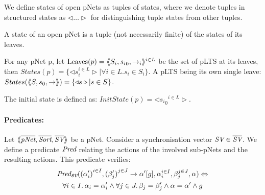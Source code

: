 \documentclass{llncs}
\begin{document}
%

We define states of open pNets as tuples of states, where we denote tuples
in structured states as $\triangleleft\ldots\triangleright$ for distinguishing tuple 
states from other tuples.
\begin{definition}\label{def-states}
  A state of an open pNet is a tuple (not necessarily finite) of the
  states of its leaves.

  For any pNet p, let $\operatorname{Leaves}(p) = \langle\hspace{-0.58ex}\langle S_i,{s_i}_0, \to_i\rangle\hspace{-0.58ex}\rangle^{i \in L}$ be 
  the set of pLTS at its leaves,
  then $States(p) = \{\triangleleft s_i^{i\in L}
  \triangleright| \forall i\in L. s_i \in S_i\}$.
A pLTS being its own single leave:
  $States(\langle\hspace{-0.58ex}\langle S,s_0, \to\rangle\hspace{-0.58ex}\rangle) = \{\triangleleft s \triangleright| s \in S\}$.

The initial state is defined as:
$InitState(p) = \triangleleft {{s_i}_0}^{i\in L}  \triangleright$.
\end{definition}




\paragraph{Predicates:}
Let
$\mylangle\overline{\pNet},\overline{\Sort},\overline{\symb{SV}}\myrangle$
be a pNet. Consider a synchronisation vector $\symb{SV}\in \overline{\symb{SV}}$. We 
define a
predicate $\Pred$ relating
the actions of the involved sub-pNets and the resulting actions. This predicate verifies:
\begin{multline}
\Pred_{\symb{sv}}(\SV{{(\alpha'_i)}^{i\in I}, {(\beta'_j)}^{j\in J}} 
{\alpha'} {g}, \alpha_i^{i\in I}, \beta_j^{j\in J}, \alpha)\Leftrightarrow \\
\forall i\in I.\, \alpha_i=\alpha'_i\land \forall j \in J.\, \beta_j=\beta'_j \land 
\alpha=\alpha' 
\land g
\end{multline}
\end{document}
